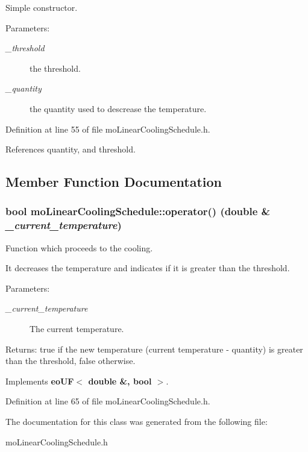 Simple constructor. 

\begin{Desc}
\item[Parameters:]
\begin{description}
\item[{\em \_\-threshold}]the threshold. \item[{\em \_\-quantity}]the quantity used to descrease the temperature. \end{description}
\end{Desc}


Definition at line 55 of file mo\-Linear\-Cooling\-Schedule.h.

References quantity, and threshold.

\subsection{Member Function Documentation}
\subsubsection{\setlength{\rightskip}{0pt plus 5cm}bool mo\-Linear\-Cooling\-Schedule::operator() (double \& {\em \_\-current\_\-temperature})\hspace{0.3cm}{\tt  [inline, virtual]}}\label{classmo_linear_cooling_schedule_a1}


Function which proceeds to the cooling. 

It decreases the temperature and indicates if it is greater than the threshold.

\begin{Desc}
\item[Parameters:]
\begin{description}
\item[{\em \_\-current\_\-temperature}]The current temperature. \end{description}
\end{Desc}
\begin{Desc}
\item[Returns:]true if the new temperature (current temperature - quantity) is greater than the threshold, false otherwise. \end{Desc}


Implements {\bf eo\-UF$<$ double \&, bool $>$}.

Definition at line 65 of file mo\-Linear\-Cooling\-Schedule.h.

The documentation for this class was generated from the following file:\begin{CompactItemize}
\item 
mo\-Linear\-Cooling\-Schedule.h\end{CompactItemize}
